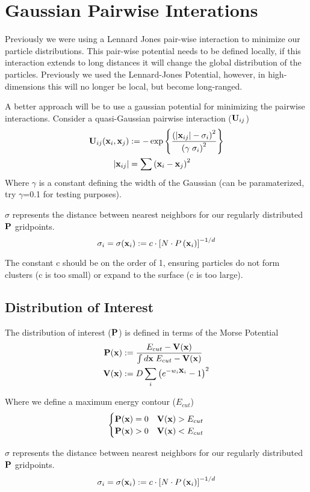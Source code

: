 \documentclass[preprint,showpacs,preprintnumbers,amsmath,amssymb]{revtex4}
\newcommand{\be}{\begin{equation}}
\newcommand{\ee}{\end{equation}}
\newcommand{\bx}{\mbox{\bf x}}        %
\newcommand{\bU}{\mbox{\bf U}}
\newcommand{\bV}{\mbox{\bf V}}
\newcommand{\bP}{\mbox{\bf P}}
\begin{document}
\section*{Gaussian Pairwise Interations}
Previously we were using a Lennard Jones pair-wise interaction to minimize our particle distributions. 
This pair-wise potential needs to be defined locally, if this interaction extends to long distances it will change the global distribution of the particles. 
Previously we used the Lennard-Jones Potential, however, in high-dimensions this will no longer be local, but become long-ranged. 

A better approach will be to use a gaussian potential for minimizing the pairwise interactions. 
Consider a quasi-Gaussian pairwise interaction ($\bU_{ij}$)
\be
\begin{split}
    \bU_{ij}(\bx_i,\bx_j)&:=-\exp\left\{\frac{\left(|\bx_{ij}|-\sigma_i\right)^2}{\left(\gamma\;\sigma_i\right)^2}\right\}\\
    |\bx_{ij}|&=\sum\left(\bx_i-\bx_j\right)^2
\end{split}
\ee
Where $\gamma$ is a constant defining the width of the Gaussian (can be paramaterized, try $\gamma$=0.1 for testing purposes). 



$\sigma$ represents the distance between nearest neighbors for our regularly distributed $\bP$ gridpoints. 
\be
\sigma_i=\sigma(\bx_i) := c\cdot \left[N\cdot P\left(\bx_i\right)\right]^{-1/d}
\ee

The constant c should be on the order of 1, ensuring particles do not form clusters (c is too small) or expand to the surface (c is too large). 
\subsection*{Distribution of Interest}
The distribution of interest ($\bP$) is defined in terms of the Morse Potential
\be
\begin{split}
    \bP(\bx)&:=\frac{E_{cut}-\bV(\bx)}{\int d\bx\; E_{cut}-\bV(\bx)}\\
    \bV(\bx)&:=D\sum_i \left(e^{-w_i\bx_i}-1\right)^2
\end{split}
\ee

Where we define a maximum energy contour ($E_{cut}$)
\[ \begin{cases} 
    \bP(\bx)=0 & \bV(\bx) > E_{cut} \\
    \bP(\bx)>0 & \bV(\bx) < E_{cut} \\
   \end{cases}
\]

$\sigma$ represents the distance between nearest neighbors for our regularly distributed $\bP$ gridpoints. 
\be
\sigma_i=\sigma(\bx_i) := c\cdot \left[N\cdot P\left(\bx_i\right)\right]^{-1/d}
\ee
\end{document}
